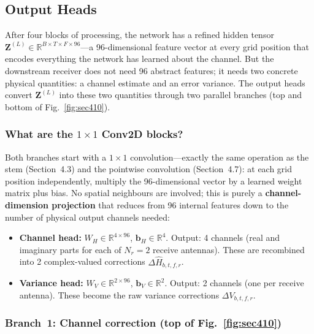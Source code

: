 \documentclass[11pt,a4paper]{article}
\newcommand{\bZ}{\mathbf{Z}}
\begin{document}
	\subsection{Output Heads}
	
	After four blocks of processing, the network has a refined hidden tensor $\bZ^{(L)} \in \mathbb{R}^{B \times T \times F \times 96}$---a 96-dimensional feature vector at every grid position that encodes everything the network has learned about the channel.  But the downstream receiver does not need 96 abstract features; it needs two concrete physical quantities: a channel estimate and an error variance.  The output heads convert $\bZ^{(L)}$ into these two quantities through two parallel branches (top and bottom of Fig.~\ref{fig:sec410}).
	
	\subsubsection*{What are the $1 \times 1$ Conv2D blocks?}
	
	Both branches start with a $1 \times 1$ convolution---exactly the same operation as the stem (Section~4.3) and the pointwise convolution (Section~4.7): at each grid position independently, multiply the 96-dimensional vector by a learned weight matrix plus bias.  No spatial neighbours are involved; this is purely a \textbf{channel-dimension projection} that reduces from 96 internal features down to the number of physical output channels needed:
	
	\begin{itemize}[nosep]
		\item \textbf{Channel head:} $W_H \in \mathbb{R}^{4 \times 96}$, $\mathbf{b}_H \in \mathbb{R}^{4}$.  Output: 4 channels (real and imaginary parts for each of $N_r = 2$ receive antennas).  These are recombined into 2 complex-valued corrections $\Delta\widehat{H}_{b,t,f,r}$.
		\item \textbf{Variance head:} $W_V \in \mathbb{R}^{2 \times 96}$, $\mathbf{b}_V \in \mathbb{R}^{2}$.  Output: 2 channels (one per receive antenna).  These become the raw variance corrections $\Delta V_{b,t,f,r}$.
	\end{itemize}
	
	\subsubsection*{Branch~1: Channel correction (top of Fig.~\ref{fig:sec410})}
	
\end{document}

